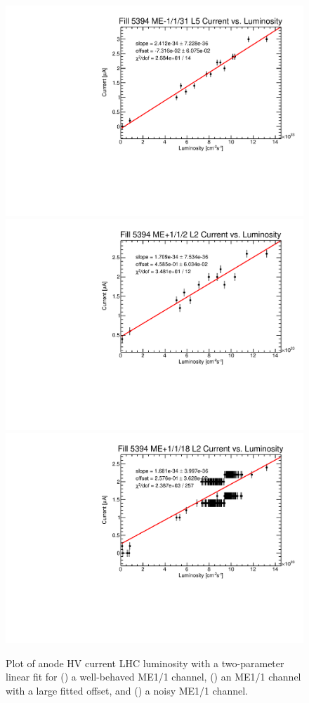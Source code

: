 \begin{figure}
	\centering
	\includegraphics[width=0.7\twoThirdsFigWidth]{figures/neutron/ME11_N_31_5_f5394_curr_lumi.pdf}
	\includegraphics[width=0.7\twoThirdsFigWidth]{figures/neutron/ME11_P_02_2_f5394_curr_lumi.pdf}
	\includegraphics[width=0.7\twoThirdsFigWidth]{figures/neutron/ME11_P_18_2_f5394_curr_lumi.pdf}
	\caption{Plot of anode HV current \vs LHC luminosity with a two-parameter linear fit for () a well-behaved ME1/1 channel, () an ME1/1 channel with a large fitted offset, and () a noisy ME1/1 channel.}
	\label{fig:ME11_IvsL}
\end{figure}

